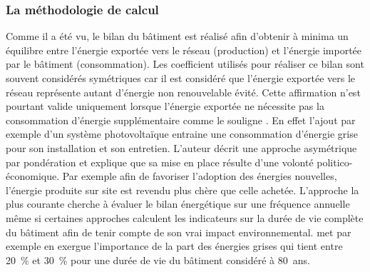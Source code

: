 \subsubsection{La méthodologie de calcul} %
\label{ssub:la_methodologie_de_calcul}
Comme il a été vu, le bilan du bâtiment est réalisé afin d’obtenir à minima un équilibre
entre l’énergie exportée vers le réseau (production) et l’énergie importée par le
bâtiment (consommation).
Les coefficient utilisés pour réaliser ce bilan sont souvent considérés
symétriques car il est considéré que l’énergie exportée vers le réseau représente
autant d’énergie non renouvelable évité. Cette affirmation n’est pourtant valide
uniquement lorsque l’énergie exportée ne nécessite pas la consommation d’énergie
supplémentaire comme le souligne \textcite{Sartori2012220}. En effet l’ajout par exemple d’un système
photovoltaïque entraine une consommation d’énergie grise pour son installation et
son entretien. L’auteur décrit une approche asymétrique par pondération et explique que
sa mise en place résulte d’une volonté politico-économique. Par exemple afin
de favoriser l’adoption des énergies nouvelles, l’énergie produite sur site
est revendu plus chère que celle achetée.
L’approche la plus courante cherche à évaluer le bilan énergétique sur une fréquence annuelle
même si certaines approches calculent les indicateurs sur la durée de vie complète
du bâtiment afin de tenir compte de son vrai impact environnemental.
\textcite{Voss201146} met par exemple en exergue l’importance de la part des énergies grises
qui tient entre \SI{20}{\percent} et \SI{30}{\percent} pour une durée de vie du bâtiment
considéré à \SI{80}{ans}.

